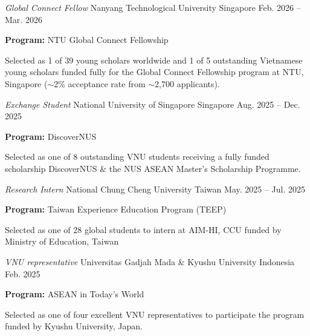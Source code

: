 
\begin{cventries}
  {\fontsize{8.8pt}{1.15em}\selectfont
  \cventry
    {\textit{Global Connect Fellow}}
    {Nanyang Technological University}
    {Singapore}
    {Feb. 2026 -- Mar. 2026}
    {
      \begin{cvitems}
        \item {\textbf{Program:} NTU Global Connect Fellowship}
        \item {Selected as 1 of 39 young scholars worldwide and 1 of 5 outstanding Vietnamese young scholars funded fully for the Global Connect Fellowship program at NTU, Singapore ($\sim$2\% acceptance rate from $\sim$2,700 applicants).}
      \end{cvitems}
    }

  \cventry
    {\textit{Exchange Student}}
    {National University of Singapore}
    {Singapore}
    {Aug. 2025 -- Dec. 2025}
    {
      \begin{cvitems}
        \item {\textbf{Program:} DiscoverNUS}
        \item {Selected as one of 8 outstanding VNU students receiving a fully funded scholarship DiscoverNUS \& the NUS ASEAN Master’s Scholarship Programme.}
      \end{cvitems}
    }

  \cventry
    {\textit{Research Intern}}
    {National Chung Cheng University}
    {Taiwan}
    {May. 2025 -- Jul. 2025}
    {
      \begin{cvitems}
        \item {\textbf{Program:} Taiwan Experience Education Program (TEEP)}
        \item{Selected as one of 28 global students to intern at AIM-HI, CCU funded by Ministry of Education, Taiwan}
      \end{cvitems}
    }

  \cventry
    {\textit{VNU representative}}
    {Universitas Gadjah Mada \& Kyushu University}
    {Indonesia}
    {Feb. 2025}
    {
      \begin{cvitems}
        \item {\textbf{Program:} ASEAN in Today's World}
        \item {Selected as one of four excellent VNU representatives to participate the program funded by Kyushu University, Japan.}
      \end{cvitems}
    }

}
\end{cventries}
